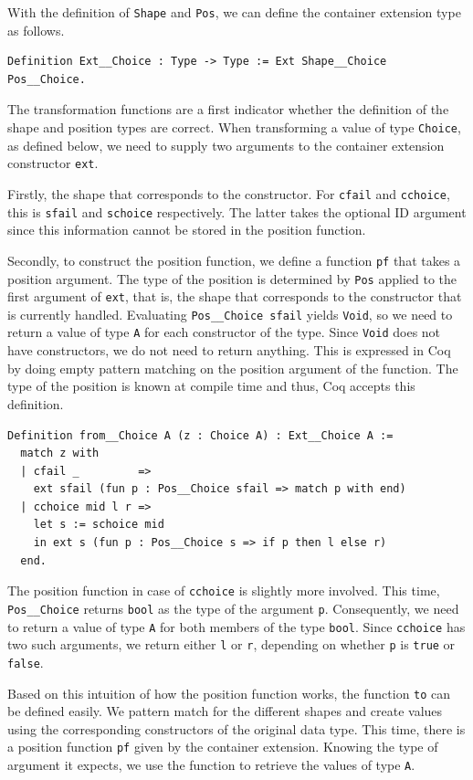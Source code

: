 \documentclass[a4paper, 11pt, fleqn, twoside]{scrreprt}
\newcommand{\cinl}[1]{\texttt{#1}}
\begin{document}
With the definition of \cinl{Shape} and \cinl{Pos}, we can define the container extension type as follows.

\begin{verbatim}
Definition Ext__Choice : Type -> Type := Ext Shape__Choice Pos__Choice.
\end{verbatim}

The transformation functions are a first indicator whether the definition of the shape and position types are correct.
When transforming a value of type \cinl{Choice}, as defined below, we need to supply two arguments to the container extension constructor \cinl{ext}.

Firstly, the shape that corresponds to the constructor.
For \cinl{cfail} and \cinl{cchoice}, this is \cinl{sfail} and \cinl{schoice} respectively.
The latter takes the optional ID argument since this information cannot be stored in the position function.

Secondly, to construct the position function, we define a function \cinl{pf} that takes a position argument.
The type of the position is determined by \cinl{Pos} applied to the first argument of \cinl{ext}, that is, the shape that corresponds to the constructor that is currently handled.
Evaluating \cinl{Pos__Choice sfail} yields \cinl{Void}, so we need to return a value of type \cinl{A} for each constructor of the type.
Since \cinl{Void} does not have constructors, we do not need to return anything.
This is expressed in Coq by doing empty pattern matching on the position argument of the function.
The type of the position is known at compile time and thus, Coq accepts this definition.

\begin{verbatim}
Definition from__Choice A (z : Choice A) : Ext__Choice A :=
  match z with
  | cfail _         =>
    ext sfail (fun p : Pos__Choice sfail => match p with end)
  | cchoice mid l r =>
    let s := schoice mid
    in ext s (fun p : Pos__Choice s => if p then l else r)
  end.
\end{verbatim}

The position function in case of \cinl{cchoice} is slightly more involved.
This time, \cinl{Pos__Choice} returns \cinl{bool} as the type of the argument \cinl{p}.
Consequently, we need to return a value of type \cinl{A} for both members of the type \cinl{bool}.
Since \cinl{cchoice} has two such arguments, we return either \cinl{l} or \cinl{r}, depending on whether \cinl{p} is \cinl{true} or \cinl{false}.

Based on this intuition of how the position function works, the function \cinl{to} can be defined easily.
We pattern match for the different shapes and create values using the corresponding constructors of the original data type.
This time, there is a position function \cinl{pf} given by the container extension.
Knowing the type of argument it expects, we use the function to retrieve the values of type \cinl{A}.
\end{document}
